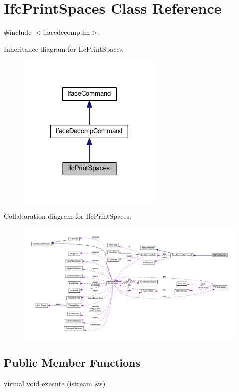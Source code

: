 \hypertarget{class_ifc_print_spaces}{}\section{Ifc\+Print\+Spaces Class Reference}
\label{class_ifc_print_spaces}


{\ttfamily \#include $<$ifacedecomp.\+hh$>$}



Inheritance diagram for Ifc\+Print\+Spaces\+:
\nopagebreak
\begin{figure}[H]
\begin{center}
\leavevmode
\includegraphics[width=197pt]{class_ifc_print_spaces__inherit__graph}
\end{center}
\end{figure}


Collaboration diagram for Ifc\+Print\+Spaces\+:
\nopagebreak
\begin{figure}[H]
\begin{center}
\leavevmode
\includegraphics[width=350pt]{class_ifc_print_spaces__coll__graph}
\end{center}
\end{figure}
\subsection*{Public Member Functions}
\begin{DoxyCompactItemize}
\item 
virtual void \mbox{\hyperlink{class_ifc_print_spaces_abc642427774b3e8e43054975ac5bf775}{execute}} (istream \&s)
\end{DoxyCompactItemize}

